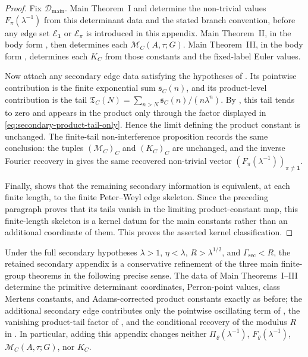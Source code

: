 \begin{proof}
  Fix \(\mathcal D_{\mathrm{main}}\).  Main Theorem~I and
   determine the non-trivial
  values \(F_\pi(\lambda^{-1})\) from this determinant data and the stated
  branch convention, before any edge set
  \(\mathcal E_{\mathbf1}\) or \(\mathcal E_\pi\) is introduced in this
  appendix.  Main Theorem~II, in the body form
  , then determines each
  \(\mathcal M_C(A,\tau;G)\).  Main Theorem~III, in the body form
  , determines each \(K_C\) from those
  constants and the fixed-label Euler values.

  Now attach any secondary edge data satisfying the hypotheses of
  .  Its pointwise contribution is the
  finite exponential sum \(\mathfrak s_C(n)\), and its product-level
  contribution is the tail
  \(\mathfrak T_C(N)=\sum_{n>N}\mathfrak s_C(n)/(n\lambda^n)\).  By
  , this tail tends to zero and
  appears in the product only through the factor displayed in
  \eqref{eq:secondary-product-tail-only}.  Hence the limit defining the
  product constant is unchanged.  The finite-tail non-interference proposition
   records the same conclusion:
  the tuples \((\mathcal M_C)_C\) and \((K_C)_C\) are unchanged, and the inverse
  Fourier recovery in  gives the
  same recovered non-trivial vector
  \((F_\pi(\lambda^{-1}))_{\pi\ne\mathbf1}\).

  Finally,  shows that the remaining
  secondary information is equivalent, at each finite length, to the finite
  Peter--Weyl edge skeleton.  Since the preceding paragraph proves that its
  tails vanish in the limiting product-constant map, this finite-length
  skeleton is a kernel datum for the main constants rather than an additional
  coordinate of them.  This proves the asserted kernel classification.
\end{proof}

\begin{corollary}
  \label{cor:secondary-package-closure}
  Under the full secondary hypotheses
  \(\lambda>1\), \(\eta<\lambda\), \(R>\lambda^{1/2}\), and
  \(\Gamma_{\mathrm{sec}}<R\), the retained secondary appendix is a
  conservative refinement of the three main finite-group theorems in the
  following precise sense.  The data of Main Theorems~I--III determine the
  primitive determinant coordinates, Perron-point values, class Mertens
  constants, and Adams-corrected product constants exactly as before; the
  additional secondary edge contributes only the pointwise oscillating term
  of , the vanishing product-tail
  factor of , and the conditional
  recovery of the modulus \(R\) in
  .  In particular, adding
  this appendix changes neither \(\Pi_\varrho(\lambda^{-1})\),
  \(F_\varrho(\lambda^{-1})\), \(\mathcal M_C(A,\tau;G)\), nor \(K_C\).
\end{corollary}

